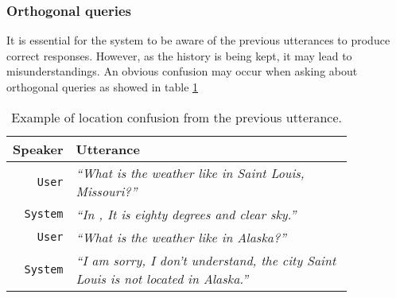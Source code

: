 

\subsubsection{Orthogonal queries}

It is essential for the system to be aware of the previous utterances to produce correct responses.
However, as the history is being kept, it may lead to misunderstandings.
An obvious confusion may occur when asking about orthogonal queries as showed in table \ref{table:confusion}

\begin{table}[h]
\centering
\begin{tabular}{ | r | p{0.85\linewidth} | } \hline
	Speaker & Utterance \\ \hline
	\texttt{User} & \textit{``What is the weather like in Saint Louis, Missouri?''} \\ \hline
	\texttt{System} & \textit{``In , It is eighty degrees and clear sky.''} \\ \hline
	\texttt{User} & \textit{``What is the weather like in Alaska?''} \\ \hline
	\texttt{System} & \textit{``I am sorry, I don't understand, the city Saint Louis is not located in Alaska.''} \\ \hline
\end{tabular}
\caption[Orthogonal time queries]{Example of location confusion from the previous utterance.}
\label{table:confusion}
\end{table}

